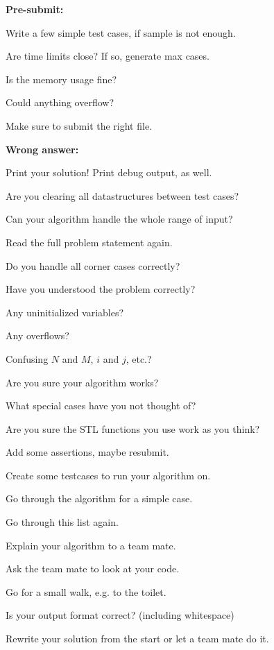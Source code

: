 \textbf{Pre-submit:}
\begin{myitemize}
	\item Write a few simple test cases, if sample is not enough.
	\item Are time limits close? If so, generate max cases.
	\item Is the memory usage fine?
	\item Could anything overflow?
	\item Make sure to submit the right file.
\end{myitemize}

\textbf{Wrong answer:}
\begin{myitemize}
	\item Print your solution! Print debug output, as well.
	\item Are you clearing all datastructures between test cases?
	\item Can your algorithm handle the whole range of input?
	\item Read the full problem statement again.
	\item Do you handle all corner cases correctly?
	\item Have you understood the problem correctly?
	\item Any uninitialized variables?
	\item Any overflows?
	\item Confusing $N$ and $M$, $i$ and $j$, etc.?
	\item Are you sure your algorithm works?
	\item What special cases have you not thought of?
	\item Are you sure the STL functions you use work as you think?
	\item Add some assertions, maybe resubmit.
	\item Create some testcases to run your algorithm on.
	\item Go through the algorithm for a simple case.
	\item Go through this list again.
	\item Explain your algorithm to a team mate.
	\item Ask the team mate to look at your code.
	\item Go for a small walk, e.g. to the toilet.
	\item Is your output format correct? (including whitespace)
	\item Rewrite your solution from the start or let a team mate do it.
\end{myitemize}


